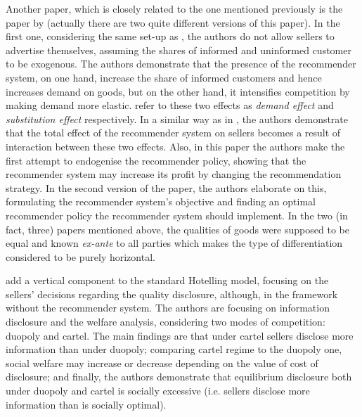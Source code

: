 \documentclass[a4paper]{article}
\begin{document}
	
Another paper, which is closely related to the one mentioned previously is the paper by \cite{li2018recommender} (actually there are two quite different versions of this paper). In the first one, considering the same set-up as \cite{chen2016advertising}, the authors do not allow sellers to advertise themselves, assuming the shares of informed and uninformed customer to be exogenous. The authors demonstrate that the presence of the recommender system, on one hand, increase the share of informed customers and hence increases demand on goods, but on the other hand, it intensifies competition by making demand more elastic. \cite{li2018recommender} refer to these two effects as \textit{demand effect} and \textit{substitution effect} respectively. In a similar way as in \cite{chen2016advertising}, the authors demonstrate that the total effect of the recommender system on sellers becomes a result of interaction between these two effects. Also, in this paper the authors make the first attempt to endogenise the recommender policy, showing that the recommender system may increase its profit by changing the recommendation strategy. In the second version of the paper, the authors elaborate on this, formulating the recommender system's objective and finding an optimal recommender policy the recommender system should implement. In the two (in fact, three) papers mentioned above, the qualities of goods were supposed to be equal and known \textit{ex-ante} to all parties which makes the type of differentiation considered to be purely horizontal.
	
\cite{levin2009quality} add a vertical component to the standard Hotelling model, focusing on the sellers' decisions regarding the quality disclosure, although, in the framework without the recommender system. The authors are focusing on information disclosure and the welfare analysis,  considering two modes of competition: duopoly and cartel. The main findings are that under cartel sellers disclose more information than under duopoly; comparing cartel regime to the duopoly one, social welfare may increase or decrease depending on the value of cost of disclosure; and finally, the authors demonstrate that equilibrium disclosure both under duopoly and cartel is socially excessive (i.e. sellers disclose more information than is socially optimal). 
\end{document}
